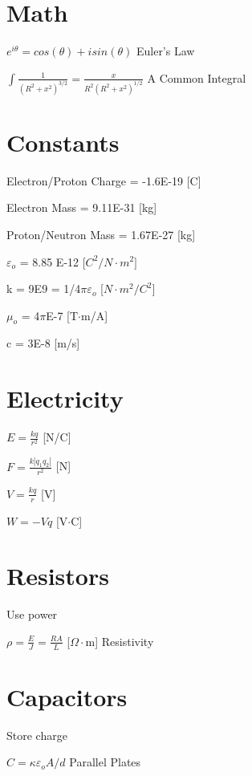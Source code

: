 \documentclass{article}
\begin{document}
\raggedright
\section{Math}

\LARGE ${e^{i\theta}=cos(\theta)+isin(\theta)}$
\large Euler's Law

\LARGE ${\int \frac{1}{(R^2+x^2)^{3/2}}=\frac{x}{R^2(R^2+x^2)^{1/2}}}$
\large A Common Integral

\section{Constants}
\Large {Electron/Proton Charge = -1.6E-19 [C]}

\Large {Electron Mass = 9.11E-31 [kg]}

\Large {Proton/Neutron Mass = 1.67E-27 [kg]}

\Large {$\varepsilon_o$ = 8.85 E-12 [$C^2/N\cdot{m^2}]$}

\Large {k = 9E9 = 1/4$\pi\varepsilon_o$ [$N\cdot{m^2}/{C^2}]$}

\Large {$\mu_o$ = 4$\pi$E-7 [T$\cdot$m/A]}

\Large {c = 3E-8 [m/s]}


\section{Electricity}

\LARGE ${E=\frac{kq}{r^2}} $  \large{[N/C]}

\LARGE ${F=\frac{k|q_1q_2|}{r^2}}$ \large{[N]}

\LARGE ${V=\frac{kq}{r}}$ \large{[V]}

\LARGE ${W=-Vq}$ \large{[V$\cdot$C]}

\section{Resistors}

\large Use power

\LARGE ${\rho=\frac{E}{J}=\frac{RA}{L}}$ \large{[$\Omega\cdot$m]}
\large{Resistivity}

\section{Capacitors}

\large Store charge

\LARGE$C =\kappa\varepsilon_oA/d$
\large{Parallel Plates}
\end{document}
